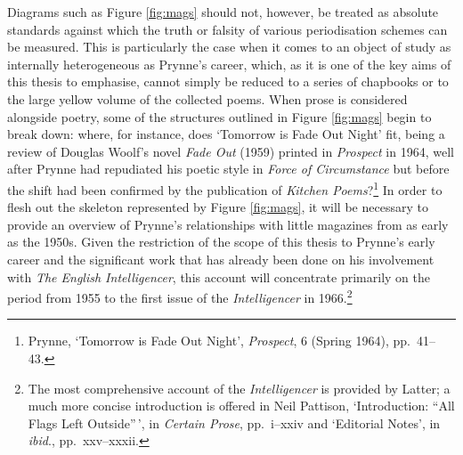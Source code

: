 \documentclass[]{article}
\begin{document}
Diagrams such as Figure \ref{fig:mags} should not, however, be treated
as absolute standards against which the truth or falsity of various
periodisation schemes can be measured. This is particularly the case
when it comes to an object of study as internally heterogeneous as
Prynne's career, which, as it is one of the key aims of this thesis to
emphasise, cannot simply be reduced to a series of chapbooks or to the
large yellow volume of the collected poems. When prose is considered
alongside poetry, some of the structures outlined in Figure
\ref{fig:mags} begin to break down: where, for instance, does `Tomorrow
is Fade Out Night' fit, being a review of Douglas Woolf's novel
\emph{Fade Out} (1959) printed in \emph{Prospect} in 1964, well after
Prynne had repudiated his poetic style in \emph{Force of Circumstance}
but before the shift had been confirmed by the publication of
\emph{Kitchen Poems}?\footnote{Prynne, `Tomorrow is Fade Out Night',
  \emph{Prospect}, 6 (Spring 1964), pp.~41--43.} In order to flesh out
the skeleton represented by Figure \ref{fig:mags}, it will be necessary
to provide an overview of Prynne's relationships with little magazines
from as early as the 1950s. Given the restriction of the scope of this
thesis to Prynne's early career and the significant work that has
already been done on his involvement with \emph{The English
Intelligencer}, this account will concentrate primarily on the period
from 1955 to the first issue of the \emph{Intelligencer} in
1966.\footnote{The most comprehensive account of the
  \emph{Intelligencer} is provided by Latter; a much more concise
  introduction is offered in Neil Pattison, `Introduction: ``All Flags
  Left Outside''\,', in \emph{Certain Prose}, pp.~i--xxiv and `Editorial
  Notes', in \emph{ibid}., pp.~xxv--xxxii.} \newpage
\end{document}
